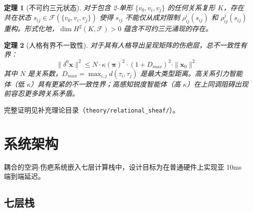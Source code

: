 \documentclass[11pt]{article}
\newtheorem{theorem}{定理}[section]
\begin{document}
\begin{theorem}[不可约三元状态]
\label{thm:sheaf-triadic}
对于包含 2-单形 $\{v_0, v_i, v_j\}$ 的任何关系复形 $K$，存在共在状态 $s_{ij} \in \mathcal{F}(\{v_0, v_i, v_j\})$ 使得 $s_{ij}$ 不能仅从成对限制 $\rho_{ij}^i(s_{ij})$ 和 $\rho_{ij}^j(s_{ij})$ 重构。形式化地，$\dim H^2(K, \mathcal{F}) > 0$ 蕴含不可约三元涌现的存在。
\end{theorem}

\begin{theorem}[人格有界不一致性]
\label{thm:sheaf-personality}
对于具有人格导出呈现矩阵的伤疤层，总不一致性有界：
\begin{equation}
\|\delta^0 \mathbf{x}\|^2 \leq N \cdot \kappa(\boldsymbol{\pi})^2 \cdot (1 + D_{max})^2 \cdot \|\mathbf{x}_0\|^2
\end{equation}
其中 $N$ 是关系数，$D_{max} = \max_{i,j} d(\tau_i, \tau_j)$ 是最大类型距离。高关系引力智能体（低 $\kappa$）具有更紧的不一致性界；高感知锐度智能体（高 $\kappa$）在上同调阻碍出现前容忍更多跨关系矛盾。
\end{theorem}

完整证明见补充理论目录（\texttt{theory/relational\_sheaf/}）。

\section{系统架构}
\label{sec:architecture}

耦合的空洞-伤疤系统嵌入七层计算栈中，设计目标为在普通硬件上实现亚 10ms 端到端延迟。

\subsection{七层栈}
\end{document}
